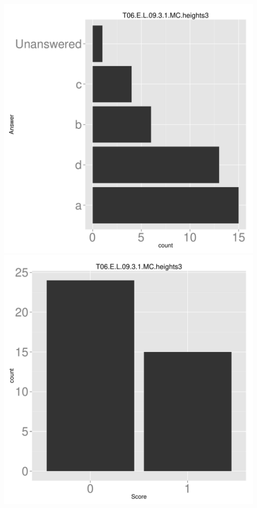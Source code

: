 \documentclass[12pt,nohyper]{tufte-handout}\usepackage[]{graphicx}\usepackage[]{color}
\begin{document}
\begin{center} \includegraphics[width=.45\linewidth]{Topic06_38_answer} \includegraphics[width=.45\linewidth]{Topic06_38_score} \end{center} 
\end{document}
